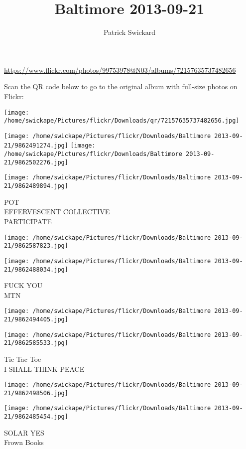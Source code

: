 \documentclass[10pt,letterpaper]{article}
\title{Baltimore 2013-09-21}
\author{Patrick Swickard}
\date{}
\begin{document}
\maketitle

\url{https://www.flickr.com/photos/99753978@N03/albums/72157635737482656}

Scan the QR code below to go to the original album with full-size photos on Flickr:

\texttt{[image: /home/swickape/Pictures/flickr/Downloads/qr/72157635737482656.jpg]}
\pagebreak

\texttt{[image: /home/swickape/Pictures/flickr/Downloads/Baltimore 2013-09-21/9862491274.jpg]}
\texttt{[image: /home/swickape/Pictures/flickr/Downloads/Baltimore 2013-09-21/9862502276.jpg]}

\texttt{[image: /home/swickape/Pictures/flickr/Downloads/Baltimore 2013-09-21/9862489894.jpg]}

POT\\
EFFERVESCENT COLLECTIVE\\
PARTICIPATE
\pagebreak

\texttt{[image: /home/swickape/Pictures/flickr/Downloads/Baltimore 2013-09-21/9862587823.jpg]}

\vspace{0.25in}
\texttt{[image: /home/swickape/Pictures/flickr/Downloads/Baltimore 2013-09-21/9862488034.jpg]}

FUCK YOU\\
MTN
\pagebreak

\texttt{[image: /home/swickape/Pictures/flickr/Downloads/Baltimore 2013-09-21/9862494405.jpg]}

\vspace{0.25in}
\texttt{[image: /home/swickape/Pictures/flickr/Downloads/Baltimore 2013-09-21/9862585533.jpg]}

Tic Tac Toe\\
I SHALL THINK PEACE
\pagebreak

\texttt{[image: /home/swickape/Pictures/flickr/Downloads/Baltimore 2013-09-21/9862498506.jpg]}

\vspace{0.25in}
\texttt{[image: /home/swickape/Pictures/flickr/Downloads/Baltimore 2013-09-21/9862485454.jpg]}

SOLAR YES\\
Frown Books
\pagebreak
\end{document}
